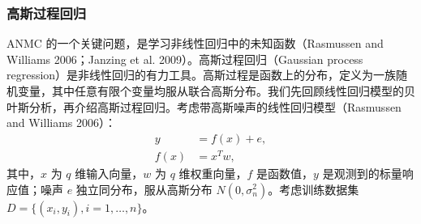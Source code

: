 \subsubsection{高斯过程回归}

ANMC 的一个关键问题，是学习非线性回归中的未知函数（Rasmussen and Williams 2006；Janzing et al. 2009）。高斯过程回归（Gaussian process regression）是非线性回归的有力工具。高斯过程是函数上的分布，定义为一族随机变量，其中任意有限个变量均服从联合高斯分布。我们先回顾线性回归模型的贝叶斯分析，再介绍高斯过程回归。考虑带高斯噪声的线性回归模型（Rasmussen and Williams 2006）：
\begin{equation}
\begin{aligned}
y&=f(x)+e,\\
f(x)&=x^Tw,
\end{aligned}
\tag{7.366}
\end{equation}
其中，$x$ 为 $q$ 维输入向量，$w$ 为 $q$ 维权重向量，$f$ 是函数值，$y$ 是观测到的标量响应值；噪声 $e$ 独立同分布，服从高斯分布 $N(0,\sigma_n^2)$。考虑训练数据集 $D=\{(x_i,y_i),i=1,\ldots,n\}$。

